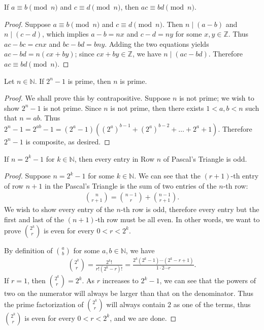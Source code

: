 \documentclass{exam}
\begin{document}
\begin{proposition}{5.24}
    If $a\equiv b\pmod n$ and $c\equiv d\pmod n$, then $ac\equiv bd\pmod n$.
\end{proposition}

\begin{proof}
    Suppose $a\equiv b\pmod n$ and $c\equiv d\pmod n$. Then $n\mid (a-b)$ and $n\mid (c-d)$, which implies $a-b = nx$ and $c-d=ny$ for some $x, y\in\mathbb Z$. Thus $ac-bc = cnx$ and $bc -bd = bny$. Adding the two equations yields $ac-bd = n(cx + by)$; since $cx + by\in\mathbb Z$, we have $n\mid(ac-bd)$. Therefore $ac\equiv bd \pmod n$.
\end{proof}

\begin{proposition}{5.25}
    Let $n\in\mathbb N$. If $2^n-1$ is prime, then $n$ is prime.
\end{proposition}

\begin{proof}
    We shall prove this by contrapositive. Suppose $n$ is not prime; we wish to show $2^n-1$ is not prime. Since $n$ is not prime, then there exists $1 < a, b < n$ such that $n=ab$. Thus $2^n-1 = 2^{ab}-1 = (2^a-1)((2^a)^{b-1} + (2^a)^{b-2} +\dots+2^a+1)$. Therefore $2^n-1$ is composite, as desired.
\end{proof}

\begin{proposition}{5.26}
    If $n = 2^k-1$ for $k\in\mathbb N$, then every entry in Row $n$ of Pascal's Triangle is odd.
\end{proposition}

\begin{proof}
    Suppose $n = 2^k-1$ for some $k\in\mathbb N$. We can see that the $(r+1)$-th entry of row $n+1$ in the Pascal's Triangle is the sum of two entries of the $n$-th row:
    \begin{align*}
        \binom{n}{r+1}=\binom{n-1}{r}+\binom{n-1}{r+1}.
    \end{align*}
    We wish to show every entry of the $n$-th row is odd, therefore every entry but the first and last of the $(n+1)$-th row must be all even. In other words, we want to prove $\binom{2^k}{r}$ is even for every $0 < r < 2^k$.

    By definition of $\binom a b$ for some $a,b\in\mathbb N$, we have
    \begin{align*}
        \binom{2^k}{r} = \frac{2^k!}{r!(2^k-r)!}=\frac{2^k(2^k-1)\cdots(2^k-r+1)}{1\cdot2\cdots r}.
    \end{align*}
    If $r = 1$, then $\binom{2^k}{r} = 2^k$. As $r$ increases to $2^k-1$, we can see that the powers of two on the numerator will always be larger than that on the denominator. Thus the prime factorization of $\binom{2^k}r$ will always contain $2$ as one of the terms, thus $\binom{2^k}r$ is even for every $0 < r < 2^k$, and we are done.
\end{proof}
\end{document}
